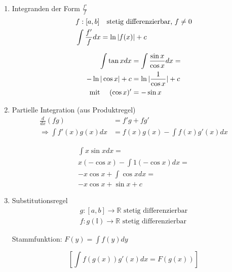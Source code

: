 \begin{enumerate}
	\item Integranden der Form $\frac{f'}{f}$ \\
	\begin{align*}
		&f: [a, b] \text{\hspace{10px}stetig differenzierbar, $f \neq 0$}\\
		&\int \frac{f'}{f} dx = \ln |f(x)| + c \\
	\end{align*}
	
	\begin{example}
		\begin{align*}
			\int \tan x dx &= \int \frac{\sin x}{\cos x} dx =\\
			- \ln |\cos x| + c &= \ln |\frac{1}{\cos x}| + c \\
			\text{mit \hspace{10px}} (\cos x)' &= - \sin x
		\end{align*}
	\end{example}
	
	\item Partielle Integration (aus Produktregel)
	\begin{align*}
		\frac{d}{dx} (f g) &= f' g + f g' \\
		\Rightarrow \int f'(x) g(x) dx &= f(x) g(x) - \int f(x) g'(x) dx
	\end{align*}
	
	\begin{example}
		\begin{align*}
			\int x \sin x dx = \\
			x (- \cos x) - \int 1 (- \cos x) dx = \\
			-x \cos x + \int \cos x dx = \\
			-x \cos x + \sin x + c
		\end{align*}
	\end{example}
	
	\item Substitutionsregel
		\begin{align*}
			g: [a, b] \rightarrow \mathbb{R} \text{ stetig differenzierbar} \\
			f: g(\mathbb{I}) \rightarrow \mathbb{R} \text{ stetig differenzierbar}
		\end{align*}
		
		Stammfunktion: $F(y) = \int f(y) dy$
		
		\begin{equation*}
			\left[ \int f(g(x)) g'(x) dx = F(g(x)) \right]
		\end{equation*}
		

\end{enumerate}
